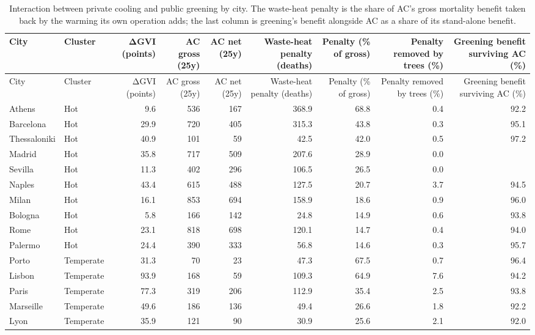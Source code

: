 \begingroup\scriptsize
\begin{longtable}{llrrrrrrr}
\caption{Interaction between private cooling and public greening by city. The waste-heat penalty is the share of AC's gross mortality benefit taken back by the warming its own operation adds; the last column is greening's benefit alongside AC as a share of its stand-alone benefit.} \\ 
  \toprule
City & Cluster & ΔGVI (points) & AC gross (25y) & AC net (25y) & Waste-heat penalty (deaths) & Penalty (\% of gross) & Penalty removed by trees (\%) & Greening benefit surviving AC (\%) \\ 
  \midrule
\endfirsthead
  \toprule
City & Cluster & ΔGVI (points) & AC gross (25y) & AC net (25y) & Waste-heat penalty (deaths) & Penalty (\% of gross) & Penalty removed by trees (\%) & Greening benefit surviving AC (\%) \\ 
  \midrule
\endhead
Athens & Hot & 9.6 & 536 & 167 & 368.9 & 68.8 & 0.4 & 92.2 \\ 
  Barcelona & Hot & 29.9 & 720 & 405 & 315.3 & 43.8 & 0.3 & 95.1 \\ 
  Thessaloniki & Hot & 40.9 & 101 & 59 & 42.5 & 42.0 & 0.5 & 97.2 \\ 
  Madrid & Hot & 35.8 & 717 & 509 & 207.6 & 28.9 & 0.0 &  \\ 
  Sevilla & Hot & 11.3 & 402 & 296 & 106.5 & 26.5 & 0.0 &  \\ 
  Naples & Hot & 43.4 & 615 & 488 & 127.5 & 20.7 & 3.7 & 94.5 \\ 
  Milan & Hot & 16.1 & 853 & 694 & 158.9 & 18.6 & 0.9 & 96.0 \\ 
  Bologna & Hot & 5.8 & 166 & 142 & 24.8 & 14.9 & 0.6 & 93.8 \\ 
  Rome & Hot & 23.1 & 818 & 698 & 120.1 & 14.7 & 0.4 & 94.0 \\ 
  Palermo & Hot & 24.4 & 390 & 333 & 56.8 & 14.6 & 0.3 & 95.7 \\ 
  Porto & Temperate & 31.3 & 70 & 23 & 47.3 & 67.5 & 0.7 & 96.4 \\ 
  Lisbon & Temperate & 93.9 & 168 & 59 & 109.3 & 64.9 & 7.6 & 94.2 \\ 
  Paris & Temperate & 77.3 & 319 & 206 & 112.9 & 35.4 & 2.5 & 93.8 \\ 
  Marseille & Temperate & 49.6 & 186 & 136 & 49.4 & 26.6 & 1.8 & 92.2 \\ 
  Lyon & Temperate & 35.9 & 121 & 90 & 30.9 & 25.6 & 2.1 & 92.0 \\ 

\end{longtable}
